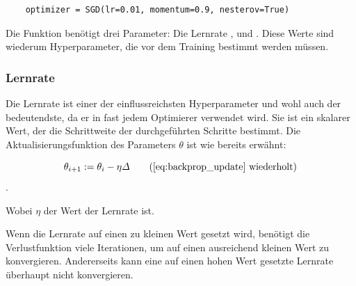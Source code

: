 \begin{lstlisting}
    optimizer = SGD(lr=0.01, momentum=0.9, nesterov=True)
\end{lstlisting}

Die Funktion  benötigt drei Parameter: Die Lernrate ,  und .
Diese Werte sind wiederum Hyperparameter, die vor dem Training bestimmt werden müssen.

\subsubsection{Lernrate}

Die Lernrate ist einer der einflussreichsten Hyperparameter und wohl auch der bedeutendste, da er in fast jedem Optimierer verwendet wird.
Sie ist ein skalarer Wert, der die Schrittweite der durchgeführten Schritte bestimmt. Die Aktualisierungsfunktion des Parameters $\theta$ ist wie bereits erwähnt:

\begin{equation}
    \theta_{i+1} := \theta_i - \eta \varDelta \tag{\ref{eq:backprop_update}     wiederholt}
\end{equation}.

Wobei $\eta$ der Wert der Lernrate ist.

Wenn die Lernrate auf einen zu kleinen Wert gesetzt wird, benötigt die Verlustfunktion viele Iterationen, um auf einen ausreichend kleinen Wert zu konvergieren.
Andererseits kann eine auf einen hohen Wert gesetzte Lernrate überhaupt nicht konvergieren.

